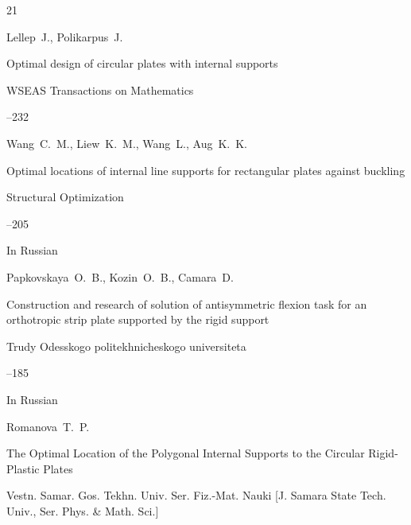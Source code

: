 \begin{thebibliography}{21}

\by Lellep~J., Polikarpus~J.

\paper Optimal design of circular plates with internal supports

\jour WSEAS Transactions on Mathematics




--232






\by Wang~C.~M., Liew~K.~M., Wang~L., Aug~K.~K.

\paper Optimal locations of internal line supports for rectangular plates against buckling

\jour Structural Optimization




--205









\lang In Russian

\by Papkovskaya~O.~B., Kozin~O.~B., Camara~D.

\paper Construction and research of solution of antisymmetric flexion task for an orthotropic strip plate supported by the rigid support

\jour Trudy Odesskogo politekhnicheskogo universiteta



--185






\lang In Russian

\by Romanova~T.~P.

\paper The Optimal Location of the Polygonal Internal Supports to the Circular Rigid-Plastic Plates

\jour Vestn. Samar. Gos. Tekhn. Univ. Ser. Fiz.-Mat. Nauki \rm [J. Samara State Tech. Univ., Ser. Phys. \& Math. Sci.]



\end{thebibliography}

